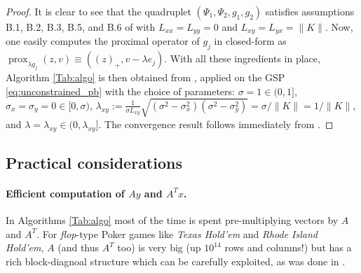 \documentclass{article} %
\newtheorem{definition}[theorem]{Definition}
\DeclareMathOperator{\prox}{prox}
\begin{document}
\begin{proof}
It is clear to see that the quadruplet $(\Psi_1, \Psi_2, g_1, g_2)$
satisfies assumptions B.1, B.2, B.3, B.5, and B.6 of
\cite{he2013accelerating} with $L_{xx} = L_{yy} = 0$ and $L_{xy} =
L_{yx} = \|K\|$. Now, one easily computes the proximal operator of
$g_j$ in closed-form as $\prox_{\lambda g_j}(z, v) \equiv ((z)_+,
v - \lambda e_j)$. With all these ingredients in place, Algorithm
\ref{Tab:algo} is then obtained from \cite[Algorithm
  T-BD]{he2013accelerating}, applied on the GSP
\eqref{eq:unconstrained_pb} with the choice of parameters: $\sigma = 1
\in (0, 1]$, $\sigma_x = \sigma_y = 0 \in [0, \sigma)$,
    $\lambda_{xy} := \frac{1}{\sigma L_{xy}}\sqrt{(\sigma^2 -
        \sigma_x^2)(\sigma^2 - \sigma_y^2)} = \sigma / \|K\| =
      1/\|K\|$, and $\lambda = \lambda_{xy} \in (0,
      \lambda_{xy}]$. The convergence result follows immediately from
  \cite[Theorem 4.2]{he2013accelerating}.
\end{proof}

\subsection{Practical considerations}
\paragraph{\textbf{Efficient computation of $Ay$ and $A^Tx$.}}
In Algorithms \ref{Tab:algo} most of the time is spent
pre-multiplying vectors by $A$ and $A^T$. For \textit{flop}-type Poker
games like \textit{Texas Hold'em} and  \textit{Rhode Island Hold'em},
$A$ (and thus $A^T$ too)  is very big (up $10^{14}$ rows and columns!)
but has a rich block-diagnoal structure which can be carefully
exploited, as was done in \cite{hoda2010smoothing}.



\end{document}
